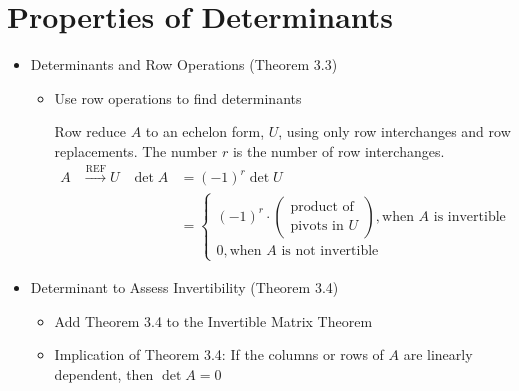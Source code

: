 \documentclass[10pt]{book}
\newenvironment{boxdef}{\begin{mdframed}[backgroundcolor=gray!30,linewidth=0pt,nobreak=true]}{\end{mdframed}}
\begin{document}
\newpage


\section{Properties of Determinants}

\begin{itemize}
	\item Determinants and Row Operations (Theorem 3.3)
		\begin{itemize}
			\item Use row operations to find determinants
			\begin{boxdef}
			Row reduce $A$ to an echelon form, $U$, using only row interchanges and row replacements. The number $r$ is the number of row interchanges.
			\begin{align*}
			A&\xrightarrow{\text{REF}}U &
			\det A &= (-1)^r\det U \\ &&
			&=
			\begin{cases}
			(-1)^r\cdot\left(\substack{\text{product of}\\ \text{pivots in $U$}}\right),
				\text{when $A$ is invertible} \\
			0,
				\text{when $A$ is not invertible}
			\end{cases}
			\end{align*}
			\end{boxdef}
		\end{itemize}
	\item Determinant to Assess Invertibility (Theorem 3.4)
		\begin{itemize}
			\item Add Theorem 3.4 to the Invertible Matrix Theorem
			\item Implication of Theorem 3.4: If the columns or rows of $A$ are linearly dependent, then $\det A=0$
		\end{itemize}
\end{itemize}
\end{document}
